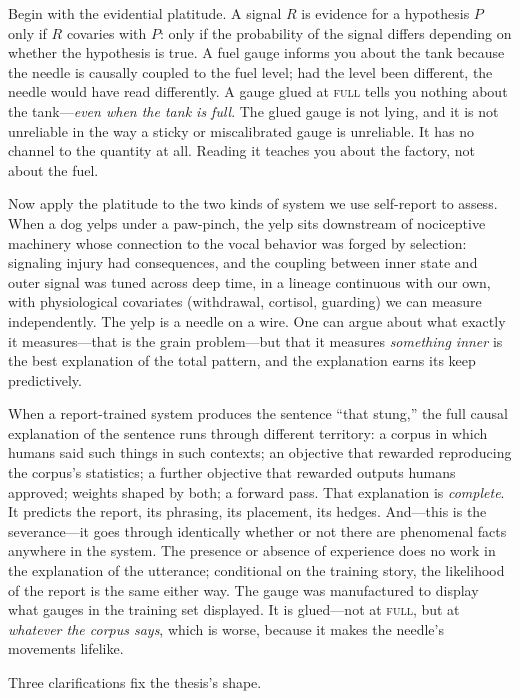 \documentclass[11pt]{article}
\begin{document}
Begin with the evidential platitude. A signal $R$ is evidence for a hypothesis $P$ only if $R$ covaries with $P$: only if the probability of the signal differs depending on whether the hypothesis is true. A fuel gauge informs you about the tank because the needle is causally coupled to the fuel level; had the level been different, the needle would have read differently. A gauge glued at \textsc{full} tells you nothing about the tank---\emph{even when the tank is full}. The glued gauge is not lying, and it is not unreliable in the way a sticky or miscalibrated gauge is unreliable. It has no channel to the quantity at all. Reading it teaches you about the factory, not about the fuel.

Now apply the platitude to the two kinds of system we use self-report to assess. When a dog yelps under a paw-pinch, the yelp sits downstream of nociceptive machinery whose connection to the vocal behavior was forged by selection: signaling injury had consequences, and the coupling between inner state and outer signal was tuned across deep time, in a lineage continuous with our own, with physiological covariates (withdrawal, cortisol, guarding) we can measure independently. The yelp is a needle on a wire. One can argue about what exactly it measures---that is the grain problem---but that it measures \emph{something inner} is the best explanation of the total pattern, and the explanation earns its keep predictively.

When a report-trained system produces the sentence ``that stung,'' the full causal explanation of the sentence runs through different territory: a corpus in which humans said such things in such contexts; an objective that rewarded reproducing the corpus's statistics; a further objective that rewarded outputs humans approved; weights shaped by both; a forward pass. That explanation is \emph{complete}. It predicts the report, its phrasing, its placement, its hedges. And---this is the severance---it goes through identically whether or not there are phenomenal facts anywhere in the system. The presence or absence of experience does no work in the explanation of the utterance; conditional on the training story, the likelihood of the report is the same either way. The gauge was manufactured to display what gauges in the training set displayed. It is glued---not at \textsc{full}, but at \emph{whatever the corpus says}, which is worse, because it makes the needle's movements lifelike.

Three clarifications fix the thesis's shape.
\end{document}
